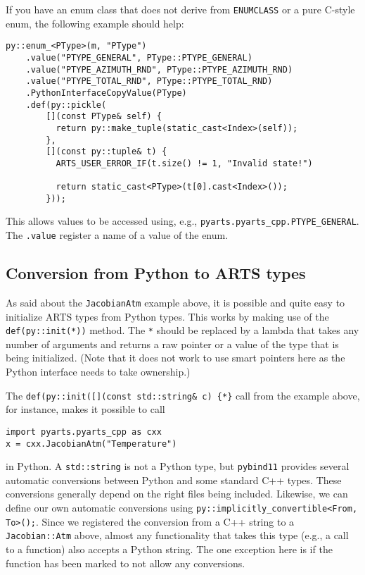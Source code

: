 If you have an enum class that does not derive from \verb|ENUMCLASS| or a pure C-style enum, the following example should help:
\begin{verbatim}
py::enum_<PType>(m, "PType")
    .value("PTYPE_GENERAL", PType::PTYPE_GENERAL)
    .value("PTYPE_AZIMUTH_RND", PType::PTYPE_AZIMUTH_RND)
    .value("PTYPE_TOTAL_RND", PType::PTYPE_TOTAL_RND)
    .PythonInterfaceCopyValue(PType)
    .def(py::pickle(
        [](const PType& self) {
          return py::make_tuple(static_cast<Index>(self));
        },
        [](const py::tuple& t) {
          ARTS_USER_ERROR_IF(t.size() != 1, "Invalid state!")
          
          return static_cast<PType>(t[0].cast<Index>());
        }));
\end{verbatim}
This allows values to be accessed using, e.g., \verb|pyarts.pyarts_cpp.PTYPE_GENERAL|.  The \verb|.value| register a name of a value of the enum.

\subsection{Conversion from Python to ARTS types}
As said about the \verb|JacobianAtm| example above, it is possible and quite easy to initialize ARTS types from Python types.  This works by
making use of the \verb|def(py::init(*))| method.  The \verb|*| should be replaced by a lambda that takes any number of arguments and 
returns a raw pointer or a value of the type that is being initialized.  (Note that it does not work to use smart pointers here as
the Python interface needs to take ownership.)

The \verb|def(py::init([](const std::string& c) {*}| call from the example above, for instance, makes it possible to call
\begin{verbatim}
import pyarts.pyarts_cpp as cxx
x = cxx.JacobianAtm("Temperature")
\end{verbatim}
in Python.  A \verb|std::string| is not a Python type, but \verb|pybind11| provides several automatic conversions between
Python and some standard C++ types.  These conversions generally depend on the right files being included.
Likewise, we can define our own automatic conversions using \verb|py::implicitly_convertible<From, To>();|.  Since we registered the 
conversion from a C++ string to a \verb|Jacobian::Atm| above, almost any functionality that takes this type (e.g., a call to a function)
also accepts a Python string.  The one exception here is if the function has been marked to not allow any conversions.

